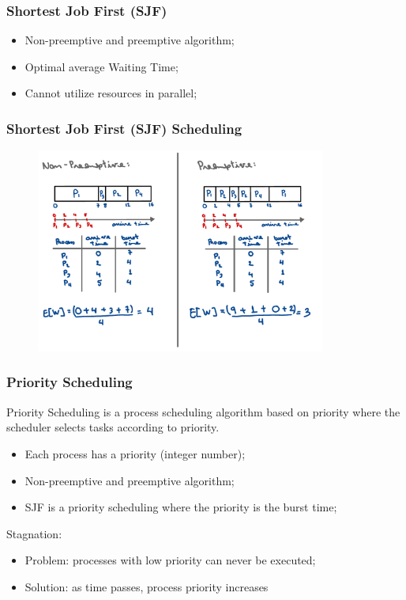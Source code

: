 \begin{frame}
    \frametitle{Shortest Job First (SJF)}

    \begin{itemize}
        \item Non-preemptive and preemptive algorithm;
        \item Optimal average Waiting Time;
        \item Cannot utilize resources in parallel;
    \end{itemize}
\end{frame}


\begin{frame}
    \frametitle{Shortest Job First (SJF) Scheduling}
    \begin{figure}
        \centering
        \includegraphics[width=0.85\textwidth]{slides/figures/sjf_example.pdf}
    \end{figure}
\end{frame}

\begin{frame}
    \frametitle{Priority Scheduling}

    Priority Scheduling is a process scheduling algorithm based on priority 
    where the scheduler selects tasks according to priority.

    \begin{itemize}
        \item Each process has a priority (integer number);
        \item Non-preemptive and preemptive algorithm;
        \item SJF is a priority scheduling where the priority is the burst time;
    \end{itemize}

    {\color{red}Stagnation:} 
    \begin{itemize}
        \item Problem: processes with low priority can never be executed;
        \item Solution: as time passes, process priority increases
    \end{itemize}

\end{frame}





